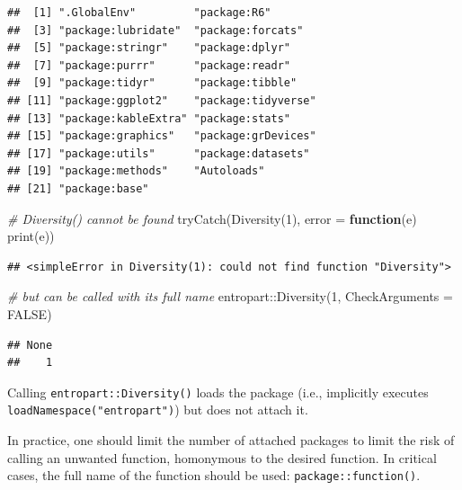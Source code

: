 \documentclass[
  12pt,
  american,
  a4paper,
  extrafontsizes,onecolumn,openright
  ]{memoir}
\newenvironment{Shaded}{\begin{snugshade}}{\end{snugshade}}
\newcommand{\AttributeTok}[1]{\textcolor[rgb]{0.77,0.63,0.00}{#1}}
\newcommand{\CommentTok}[1]{\textcolor[rgb]{0.56,0.35,0.01}{\textit{#1}}}
\newcommand{\ConstantTok}[1]{\textcolor[rgb]{0.00,0.00,0.00}{#1}}
\newcommand{\ControlFlowTok}[1]{\textcolor[rgb]{0.13,0.29,0.53}{\textbf{#1}}}
\newcommand{\DecValTok}[1]{\textcolor[rgb]{0.00,0.00,0.81}{#1}}
\newcommand{\FunctionTok}[1]{\textcolor[rgb]{0.00,0.00,0.00}{#1}}
\newcommand{\NormalTok}[1]{#1}
\newcommand{\SpecialCharTok}[1]{\textcolor[rgb]{0.00,0.00,0.00}{#1}}
\begin{document}
\begin{verbatim}
##  [1] ".GlobalEnv"         "package:R6"        
##  [3] "package:lubridate"  "package:forcats"   
##  [5] "package:stringr"    "package:dplyr"     
##  [7] "package:purrr"      "package:readr"     
##  [9] "package:tidyr"      "package:tibble"    
## [11] "package:ggplot2"    "package:tidyverse" 
## [13] "package:kableExtra" "package:stats"     
## [15] "package:graphics"   "package:grDevices" 
## [17] "package:utils"      "package:datasets"  
## [19] "package:methods"    "Autoloads"         
## [21] "package:base"
\end{verbatim}

\begin{Shaded}
\begin{Highlighting}[]
\CommentTok{\# Diversity() cannot be found}
\FunctionTok{tryCatch}\NormalTok{(}\FunctionTok{Diversity}\NormalTok{(}\DecValTok{1}\NormalTok{), }\AttributeTok{error =} \ControlFlowTok{function}\NormalTok{(e) }\FunctionTok{print}\NormalTok{(e))}
\end{Highlighting}
\end{Shaded}

\begin{verbatim}
## <simpleError in Diversity(1): could not find function "Diversity">
\end{verbatim}

\begin{Shaded}
\begin{Highlighting}[]
\CommentTok{\# but can be called with its full name}
\NormalTok{entropart}\SpecialCharTok{::}\FunctionTok{Diversity}\NormalTok{(}\DecValTok{1}\NormalTok{, }\AttributeTok{CheckArguments =} \ConstantTok{FALSE}\NormalTok{)}
\end{Highlighting}
\end{Shaded}

\begin{verbatim}
## None 
##    1
\end{verbatim}

\normalsize

Calling \texttt{entropart::Diversity()} loads the package (i.e., implicitly executes \texttt{loadNamespace("entropart")}) but does not attach it.

In practice, one should limit the number of attached packages to limit the risk of calling an unwanted function, homonymous to the desired function.
In critical cases, the full name of the function should be used: \texttt{package::function()}.
\end{document}
